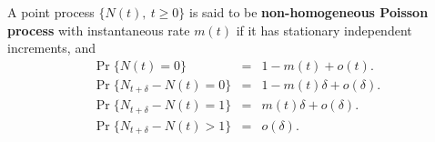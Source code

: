 \documentclass[a4paper,10pt,english]{article}
\begin{document}
\begin{defn}\label{defn:NonHomogeneousPoisson} A point process $\{N(t),~t\geqslant 0\}$ is said to be \textbf{non-homogeneous Poisson process} with instantaneous rate $m(t)$ if it has stationary independent increments, and 
 \begin{eqnarray*}\label{eq:NonHomogeneousPoisson}
 \Pr\{N(t)=0\}&=&1-m(t)+o(t). \\
  \Pr\{N_{t+\delta}-N(t)=0\} &=& 1-m(t)\delta+o(\delta). \\
   \Pr\{N_{t+\delta}-N(t)=1\} &=& m(t)\delta+o(\delta). \\
   \Pr\{N_{t+\delta}-N(t)>1\} &=& o(\delta). \\
   \end{eqnarray*}
\end{defn}
\end{document}
